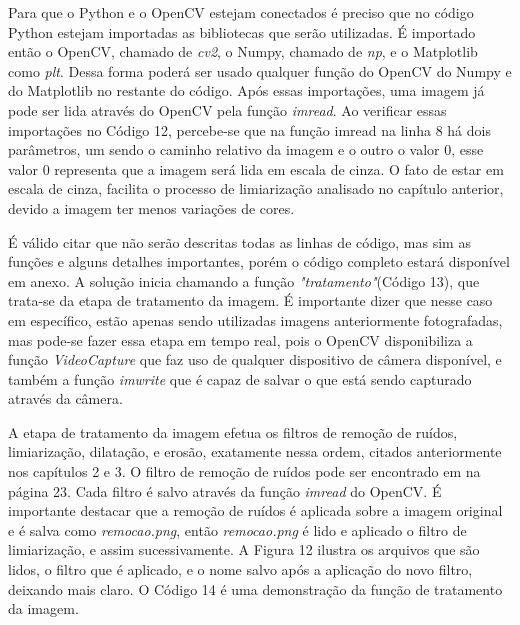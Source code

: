 Para que o Python e o OpenCV estejam conectados é preciso que no código Python estejam importadas as bibliotecas que serão utilizadas. É importado então o OpenCV, chamado de \textit{cv2}, o Numpy, chamado de \textit{np}, e o Matplotlib como \textit{plt}. Dessa forma poderá ser usado qualquer função do OpenCV do Numpy e do Matplotlib no restante do código. Após essas importações, uma imagem já pode ser lida através do OpenCV pela função \textit{imread}. Ao verificar essas importações no Código 12, percebe-se que na função imread na linha 8 há dois parâmetros, um sendo o caminho relativo da imagem e o outro o valor 0, esse valor 0 representa que a imagem será lida em escala de cinza. O fato de estar em escala de cinza, facilita o processo de limiarização analisado no capítulo anterior, devido a imagem ter menos variações de cores.



É válido citar que não serão descritas todas as linhas de código, mas sim as funções e alguns detalhes importantes, porém o código completo estará disponível em anexo. A solução inicia chamando a função \textit{"tratamento"}(Código 13), que trata-se da etapa de tratamento da imagem. É importante dizer que nesse caso em específico, estão apenas sendo utilizadas imagens anteriormente fotografadas, mas pode-se fazer essa etapa em tempo real, pois o OpenCV disponibiliza a função \textit{VideoCapture} que faz uso de qualquer dispositivo de câmera disponível, e também a função \textit{imwrite} que é capaz de salvar o que está sendo capturado através da câmera.

 

A etapa de tratamento da imagem efetua os filtros de remoção de ruídos, limiarização, dilatação, e erosão, exatamente nessa ordem, citados anteriormente nos capítulos 2 e 3. O filtro de remoção de ruídos pode ser encontrado em \cite{pcvwp} na página 23. Cada filtro é salvo através da função \textit{imread} do OpenCV. É importante destacar que a remoção de ruídos é aplicada sobre a imagem original e é salva como \textit{remocao.png}, então \textit{remocao.png} é lido e aplicado o filtro de limiarização, e assim sucessivamente. A Figura 12 ilustra os arquivos que são lidos, o filtro que é aplicado, e o nome salvo após a aplicação do novo filtro, deixando mais claro. O Código 14 é uma demonstração da função de tratamento da imagem.

